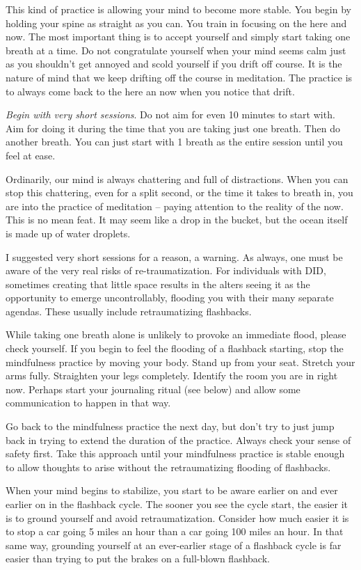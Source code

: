 \documentclass[]{book}
\begin{document}
This kind of practice is allowing your mind to become more stable. You begin by holding your spine as straight as you can. You train in focusing on the here and now. The most important thing is to accept yourself and simply start taking one breath at a time. Do not congratulate yourself when your mind seems calm just as you shouldn't get annoyed and scold yourself if you drift off course. It is the nature of mind that we keep drifting off the course in meditation. The practice is to always come back to the here an now when you notice that drift.

\emph{Begin with very short sessions}. Do not aim for even 10 minutes to start with. Aim for doing it during the time that you are taking just one breath. Then do another breath. You can just start with 1 breath as the entire session until you feel at ease.

Ordinarily, our mind is always chattering and full of distractions. When you can stop this chattering, even for a split second, or the time it takes to breath in, you are into the practice of meditation -- paying attention to the reality of the now. This is no mean feat. It may seem like a drop in the bucket, but the ocean itself is made up of water droplets.

I suggested very short sessions for a reason, a warning. As always, one must be aware of the very real risks of re-traumatization. For individuals with DID, sometimes creating that little space results in the alters seeing it as the opportunity to emerge uncontrollably, flooding you with their many separate agendas. These usually include retraumatizing flashbacks.

While taking one breath alone is unlikely to provoke an immediate flood, please check yourself. If you begin to feel the flooding of a flashback starting, stop the mindfulness practice by moving your body. Stand up from your seat. Stretch your arms fully. Straighten your legs completely. Identify the room you are in right now. Perhaps start your journaling ritual (see below) and allow some communication to happen in that way.

Go back to the mindfulness practice the next day, but don't try to just jump back in trying to extend the duration of the practice. Always check your sense of safety first. Take this approach until your mindfulness practice is stable enough to allow thoughts to arise without the retraumatizing flooding of flashbacks.

When your mind begins to stabilize, you start to be aware earlier on and ever earlier on in the flashback cycle. The sooner you see the cycle start, the easier it is to ground yourself and avoid retraumatization. Consider how much easier it is to stop a car going 5 miles an hour than a car going 100 miles an hour. In that same way, grounding yourself at an ever-earlier stage of a flashback cycle is far easier than trying to put the brakes on a full-blown flashback.
\end{document}
